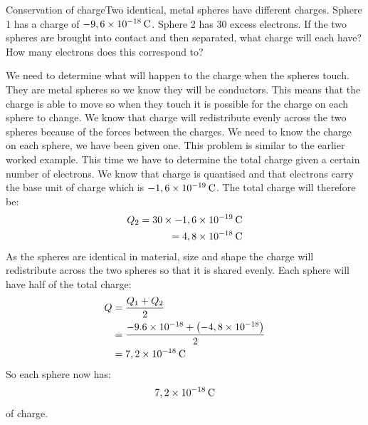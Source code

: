       \begin{wex}{Conservation of charge}{Two identical, metal spheres have different charges. Sphere 1 has a charge of $-9,6\ensuremath{\times}{10}^{-18}\phantom{\rule{2pt}{0ex}}\text{C}$. Sphere 2 has 30 excess electrons. If the two spheres are brought into contact and then separated, what charge will each have? How many electrons does this correspond to?}{
     We need to determine what will happen to the charge when the spheres touch. They are metal spheres so we know they will be conductors. This means that the charge is able to move so when they touch it is possible for the charge on each sphere to change. We know that charge will redistribute evenly across the two spheres because of the forces between the charges. We need to know the charge on each sphere, we have been given one.
     This problem is similar to the earlier worked example. This time we have to determine the total charge given a certain number of electrons. We know that charge is quantised and that electrons carry the base unit of charge which is $-1,6\ensuremath{\times}{10}^{-19}\phantom{\rule{2pt}{0ex}}\text{C}$. The total charge will therefore be:
    \begin{eqnarray*}
    {Q}_{2}=30\ensuremath{\times}-1,6\ensuremath{\times}{10}^{-19}\phantom{\rule{2pt}{0ex}}\text{C}\\ \phantom{x}=4,8\ensuremath{\times}{10}^{-18}\phantom{\rule{2pt}{0ex}}\text{C}
      \end{eqnarray*}
     As the spheres are identical in material, size and shape the charge will redistribute across the two spheres so that it is shared evenly. Each sphere will have half of the total charge:
    \begin{align*}
Q&=\frac{{Q}_{1}+{Q}_{2}}{2}\\ 
&=\frac{-9.6\ensuremath{\times}{10}^{-18}+\left(-4,8\ensuremath{\times}{10}^{-18}\right)}{2}\\ 
&=7,2\ensuremath{\times}{10}^{-18}\phantom{\rule{2pt}{0ex}}\text{C}
    \end{align*}
 So each sphere now has: 
\label{m38781*id61212}\nopagebreak\noindent{}
    \begin{equation*}
    7,2\ensuremath{\times}{10}^{-18}\phantom{\rule{2pt}{0ex}}\text{C}
      \end{equation*}
     of charge.\item \newline
}
\end{wex}

